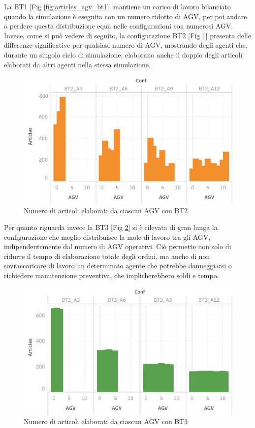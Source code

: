 \documentclass[12pt]{article}
\begin{document}
\noindent La BT1 [Fig \ref{fig:articles_agv_bt1}] mantiene un carico di lavoro bilanciato quando la simulazione è eseguita con un numero ridotto di AGV, per poi andare a perdere questa distribuzione equa nelle configurazioni con numerosi AGV.\\
\noindent Invece, come si può vedere di seguito, la configurazione BT2 [Fig \ref{fig:articles_agv_bt2}] presenta delle differenze significative per qualsiasi numero di AGV, mostrando degli agenti che, durante un singolo ciclo di simulazione, elaborano anche il doppio degli articoli elaborati da altri agenti nella stessa simulazione.

\begin{figure}[H]
\centering
  \includegraphics[width=0.8\linewidth]{Figures/Results_Graphics/Articles_BT2.png}
  \caption{Numero di articoli elaborati da ciascun AGV con BT2}\label{fig:articles_agv_bt2}
\end{figure}

\noindent Per quanto riguarda invece la BT3 [Fig \ref{fig:articles_agv_bt3}] si è rilevata di gran lunga la configurazione che meglio distribuisce la mole di lavoro tra gli AGV, indipendentemente dal numero di AGV operativi. Ciò permette non solo di ridurre il tempo di elaborazione totale degli ordini, ma anche di non sovraccaricare di lavoro un determinato agente che potrebbe danneggiarsi o richiedere manutenzione preventiva, che implicherebbero soldi e tempo.
 
\begin{figure}[H]
\centering
  \includegraphics[width=0.8\linewidth]{Figures/Results_Graphics/Articles_BT3.png}
  \caption{Numero di articoli elaborati da ciascun AGV con BT3}\label{fig:articles_agv_bt3}
\end{figure}
\end{document}
